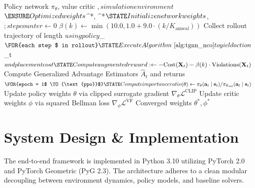 \documentclass[conference]{IEEEtran}
\begin{document}
\begin{algorithm}[t]
\caption{Curriculum-Annealed PPO Policy Training}
\label{alg:ppo_training}
\begin{algorithmic}[1]
\REQUIRE Policy network $\pi_\theta$, value critic \phi$, simulation environment $$
\ENSURE Optimized weights $\theta^*, \phi^*$
\STATE Initialize network weights $\theta, \phi$; step counter  \leftarrow 0$
    \STATE $\beta(k) \leftarrow \min(10.0, 1.0 + 9.0 \cdot (k / K_{\text{anneal}}))$
    \STATE Collect rollout trajectory of length {}$ using policy $\pi_\theta$
    \FOR{each step $ in rollout}
        \STATE Execute Algorithm~\ref{alg:tgnn_nco} to yield action $_t$ and placement cost
        \STATE Compute augmented reward:  \leftarrow -\text{Cost}(\mathbf{X}_t) - \beta(k) \cdot \text{Violations}(\mathbf{X}_t)$
    \ENDFOR
    \STATE Compute Generalized Advantage Estimators $\hat{A}_t$ and returns $
    \FOR{epoch  = 1$ \TO {\text{ppo}}$}
        \STATE Compute importance ratio (\theta) \leftarrow \pi_\theta(\mathbf{a}_t \mid \mathbf{s}_t) / \pi_{\theta_{\text{old}}}(\mathbf{a}_t \mid \mathbf{s}_t)$
        \STATE Update policy weights $\theta$ via clipped surrogate gradient $\nabla_\theta \mathcal{L}^{\text{CLIP}}$
        \STATE Update critic weights $\phi$ via squared Bellman loss $\nabla_\phi \mathcal{L}^{\text{VF}}$
    \ENDFOR
\ENDFOR
\RETURN Converged weights $\theta^*, \phi^*$
\end{algorithmic}
\end{algorithm}

\section{System Design \& Implementation}
\label{sec:system}

The end-to-end framework is implemented in Python 3.10 utilizing PyTorch 2.0 and PyTorch Geometric (PyG 2.3). The architecture adheres to a clean modular decoupling between environment dynamics, policy models, and baseline solvers.
\end{document}
